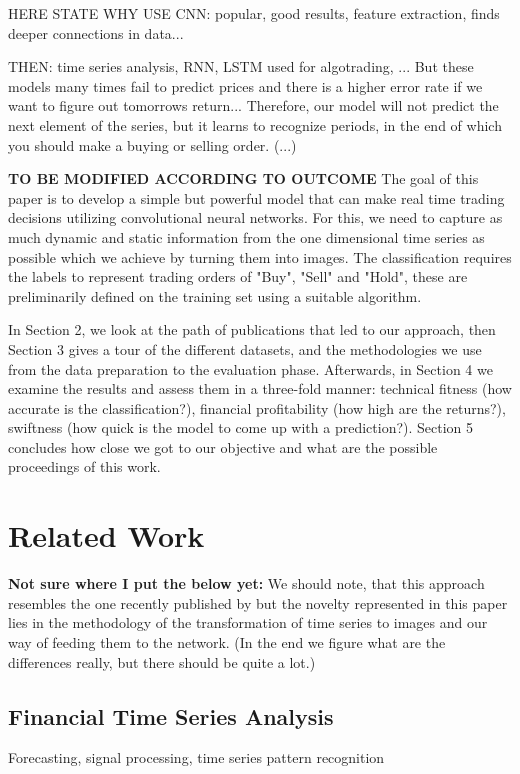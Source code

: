 \documentclass[11pt, a4paper]{article}
\begin{document}
HERE STATE WHY USE CNN: popular, good results, feature extraction, finds deeper connections in data...

THEN: time series analysis, RNN, LSTM used for algotrading, ... But these models many times fail to predict prices and there is a higher error rate if we want to figure out tomorrows return... 
Therefore, our model will not predict the next element of the series, but it learns to recognize periods, in the end of which you should make a buying or selling order. (...)


\textbf{TO BE MODIFIED ACCORDING TO OUTCOME}
The goal of this paper is to develop a simple but powerful model that can make real time trading decisions utilizing convolutional neural networks. For this, we need to capture as much dynamic 
and static information from the one dimensional time series as possible which we achieve by turning them into images. The classification requires the labels to represent trading orders of "Buy", 
"Sell" and "Hold", these are preliminarily defined on the training set using a suitable algorithm. 

In Section 2, we look at the path of publications that led to our approach, then Section 3 gives a tour of the different datasets, and the methodologies we use from the data preparation to the evaluation phase. 
Afterwards, in Section 4 we examine the results and assess them in a three-fold manner:
technical fitness (how accurate is the classification?), financial profitability (how high are the returns?), swiftness (how quick is the model to come up with a prediction?). Section 5 concludes how close we 
got to our objective and what are the possible proceedings of this work.

\section{Related Work}

\textbf{Not sure where I put the below yet:}
We should note, that this approach resembles the one recently published by \cite{sezer2018algorithmic} but the novelty represented in this paper lies in the methodology of 
the transformation of time series to images and our way of feeding them to the network. (In the end we figure what are the differences really, but there should be quite a lot.)

\subsection{Financial Time Series Analysis}
Forecasting, signal processing, time series pattern recognition
\end{document}
